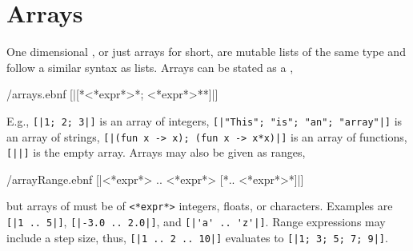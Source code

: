 \documentclass[fsharpNotes.tex]{subfiles}
\begin{document}

\section{Arrays}
\label{sec:arrays}
One dimensional , or just arrays for short, are mutable lists of the same type and follow a similar syntax as lists. Arrays can be stated as a ,
%
\begin{verbatimwrite}{\ebnf/arrays.ebnf}
[|[*<*expr*>{*; <*expr*>*}*]|]
\end{verbatimwrite}
%
E.g., \mbox{\lstinline![|1; 2; 3|]!} is an array of integers, \mbox{\lstinline![|"This"; "is"; "an"; "array"|]!} is an array of strings, \mbox{\lstinline![|(fun x -> x); (fun x -> x*x)|]!} is an array of functions, \lstinline![||]! is the empty array.  Arrays may also be given as ranges,
%
\begin{verbatimwrite}{\ebnf/arrayRange.ebnf}
[|<*expr*> .. <*expr*> [*.. <*expr*>*]|]
\end{verbatimwrite}
%
but arrays of  must be of \lstinline[language=syntax]{<*expr*>} integers, floats, or characters. Examples are \mbox{\lstinline![|1 .. 5|]!}, \mbox{\lstinline![|-3.0 .. 2.0|]!}, and \mbox{\lstinline![|'a' .. 'z'|]!}. Range expressions may include a step size, thus, \mbox{\lstinline![|1 .. 2 .. 10|]!} evaluates to \mbox{\lstinline![|1; 3; 5; 7; 9|]!}.
\end{document}

